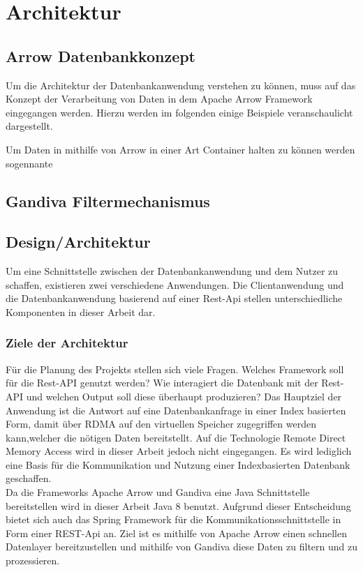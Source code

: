 \chapter{Architektur}


\section{Arrow Datenbankkonzept}

Um die Architektur der Datenbankanwendung verstehen zu können, muss auf das Konzept der Verarbeitung von Daten in dem Apache Arrow Framework eingegangen werden. Hierzu werden im folgenden einige Beispiele veranschaulicht dargestellt.

Um Daten in mithilfe von Arrow in einer Art Container halten zu können werden sogennante 



\section{Gandiva Filtermechanismus}

\section{Design/Architektur}
Um eine Schnittstelle zwischen der Datenbankanwendung und dem Nutzer zu schaffen, existieren zwei verschiedene Anwendungen. Die Clientanwendung und die Datenbankanwendung basierend auf einer Rest-Api stellen unterschiedliche Komponenten in dieser Arbeit dar.

\subsection{Ziele der Architektur}

Für die Planung des Projekts stellen sich viele Fragen. Welches Framework soll für die Rest-API genutzt werden? Wie interagiert die Datenbank mit der Rest-API und welchen Output soll diese überhaupt produzieren?
Das Hauptziel der Anwendung ist die Antwort auf eine Datenbankanfrage in einer Index basierten Form, damit über RDMA auf den virtuellen Speicher zugegriffen werden kann,welcher die nötigen Daten bereitstellt.
Auf die Technologie Remote Direct Memory Access wird in dieser Arbeit jedoch nicht eingegangen. Es wird lediglich eine Basis für die Kommunikation und Nutzung einer Indexbasierten Datenbank geschaffen.
\\
Da die Frameworks Apache Arrow und Gandiva eine Java Schnittstelle bereitstellen wird in dieser Arbeit Java 8 benutzt. 
Aufgrund dieser Entscheidung bietet sich auch das Spring Framework für die Kommunikationsschnittstelle in Form einer REST-Api an.
Ziel ist es mithilfe von Apache Arrow einen schnellen Datenlayer bereitzustellen und mithilfe von Gandiva diese Daten zu filtern und zu prozessieren.

